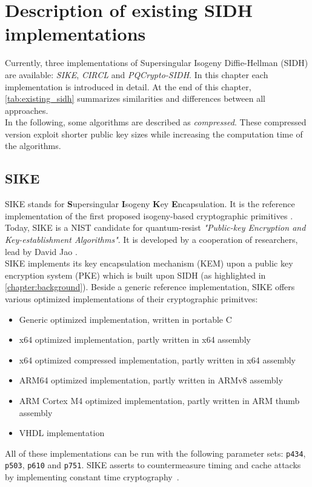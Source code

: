 \chapter{Description of existing \gls{SIDH} implementations}\label{chapter:existing_sidh}
Currently, three implementations of Supersingular Isogeny Diffie-Hellman (\gls{SIDH}) are available: \textit{\gls{SIKE}}, \textit{\gls{CIRCL}} and \textit{\gls{PQCrypto-SIDH}}. In this chapter each implementation is introduced in detail. At the end of this chapter, \autoref{tab:existing_sidh} summarizes similarities and differences between all approaches.
\\
In the following, some algorithms are described as \textit{compressed}. These compressed version exploit shorter public key sizes while increasing the computation time of the algorithms.

\section{\gls{SIKE}}
\gls{SIKE} stands for \textbf{S}upersingular \textbf{I}sogeny \textbf{K}ey \textbf{E}ncapsulation. It is the reference implementation of the first proposed isogeny-based cryptographic primitives \parencite{jao2011towards}. Today, \gls{SIKE} is a \gls{NIST} candidate for quantum-resist \textit{"Public-key Encryption and Key-establishment Algorithms"}. It is developed by a cooperation of researchers, lead by David Jao \parencite{sike2020spec}.
\\
\gls{SIKE} implements its key encapsulation mechanism (\gls{KEM}) upon a public key encryption system (\gls{PKE}) which is built upon \gls{SIDH} (as highlighted in \autoref{chapter:background}). Beside a generic reference implementation, \gls{SIKE} offers various optimized implementations of their cryptographic primitves:
\begin{itemize}
  \item Generic optimized implementation, written in portable C
  \item x64 optimized implementation, partly written in x64 assembly
  \item x64 optimized compressed implementation, partly written in x64 assembly
  \item ARM64 optimized implementation, partly written in ARMv8 assembly
  \item ARM Cortex M4 optimized implementation, partly written in ARM thumb assembly
  \item VHDL implementation
\end{itemize}
All of these implementations can be run with the following parameter sets: \texttt{p434}, \texttt{p503}, \texttt{p610} and \texttt{p751}. \gls{SIKE} asserts to countermeasure timing and cache attacks by implementing constant time cryptography~\parencite{sike2020spec}.


